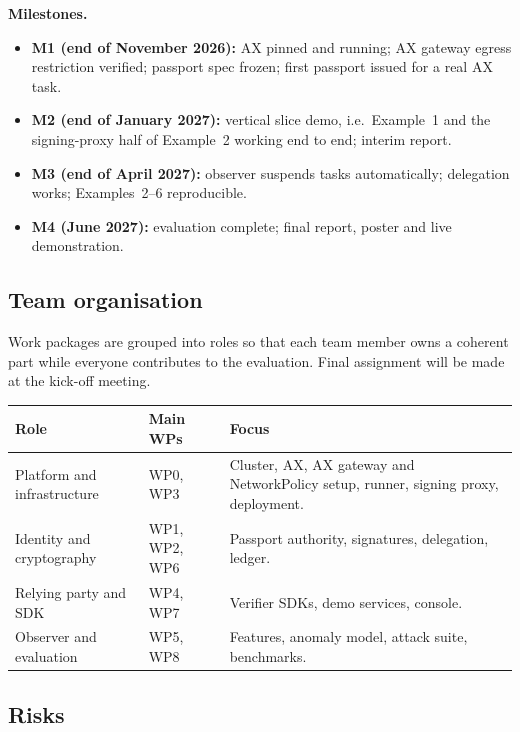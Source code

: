\textbf{Milestones.}
\begin{itemize}
  \item \textbf{M1 (end of November 2026):} AX pinned and running; AX gateway egress restriction verified; passport spec frozen; first passport issued for a real AX task.
  \item \textbf{M2 (end of January 2027):} vertical slice demo, i.e.\ Example~1 and the signing-proxy half of Example~2 working end to end; interim report.
  \item \textbf{M3 (end of April 2027):} observer suspends tasks automatically; delegation works; Examples~2--6 reproducible.
  \item \textbf{M4 (June 2027):} evaluation complete; final report, poster and live demonstration.
\end{itemize}

\subsection{Team organisation}

Work packages are grouped into roles so that each team member owns a coherent part while everyone contributes to the evaluation. Final assignment will be made at the kick-off meeting.

\begin{center}
\small
\begin{tabularx}{\linewidth}{@{}L{3.6cm}L{3.2cm}Y@{}}
\toprule
\textbf{Role} & \textbf{Main WPs} & \textbf{Focus}\\
\midrule
Platform and infrastructure & WP0, WP3 & Cluster, AX, AX gateway and NetworkPolicy setup, runner, signing proxy, deployment.\\
Identity and cryptography & WP1, WP2, WP6 & Passport authority, signatures, delegation, ledger.\\
Relying party and SDK & WP4, WP7 & Verifier SDKs, demo services, console.\\
Observer and evaluation & WP5, WP8 & Features, anomaly model, attack suite, benchmarks.\\
\bottomrule
\end{tabularx}
\end{center}

\subsection{Risks}

